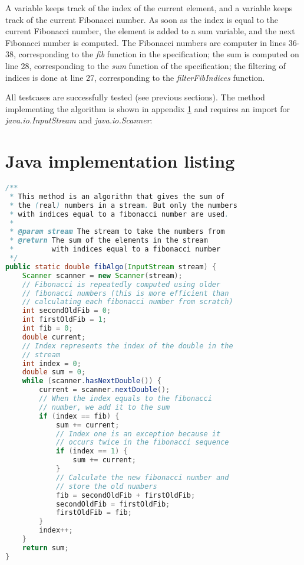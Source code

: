 \documentclass[12pt]{article}
\begin{document}
A variable keeps track of the index of the current element, and a variable keeps track of the current Fibonacci number. As soon as the index is equal to the current Fibonacci number, the element is added to a sum variable, and the next Fibonacci number is computed. The Fibonacci numbers are computer in lines 36-38, corresponding to the \textsl{fib} function in the specification; the sum is computed on line 28, corresponding to the \textsl{sum} function of the specification; the filtering of indices is done at line 27, corresponding to the \textsl{filterFibIndices} function.

All testcases are successfully tested (see previous sections). The method implementing the algorithm is shown in appendix \ref{codelisting} and requires an import for \\ \textsl{java.io.InputStream} and \textsl{java.io.Scanner}:

\appendix

\section{Java implementation listing}
\label{codelisting}
\begin{lstlisting}[language=java]
/**
 * This method is an algorithm that gives the sum of
 * the (real) numbers in a stream. But only the numbers
 * with indices equal to a fibonacci number are used.
 *
 * @param stream The stream to take the numbers from
 * @return The sum of the elements in the stream
 *         with indices equal to a fibonacci number
 */
public static double fibAlgo(InputStream stream) {
    Scanner scanner = new Scanner(stream);
    // Fibonacci is repeatedly computed using older
    // fibonacci numbers (this is more efficient than
    // calculating each fibonacci number from scratch)
    int secondOldFib = 0;
    int firstOldFib = 1;
    int fib = 0;
    double current;
    // Index represents the index of the double in the
    // stream
    int index = 0;
    double sum = 0;
    while (scanner.hasNextDouble()) {
        current = scanner.nextDouble();
        // When the index equals to the fibonacci
        // number, we add it to the sum
        if (index == fib) {
            sum += current;
            // Index one is an exception because it
            // occurs twice in the fibonacci sequence
            if (index == 1) {
                sum += current;
            }
            // Calculate the new fibonacci number and
            // store the old numbers
            fib = secondOldFib + firstOldFib;
            secondOldFib = firstOldFib;
            firstOldFib = fib;
        }
        index++;
    }
    return sum;
}
\end{lstlisting}
\end{document}
